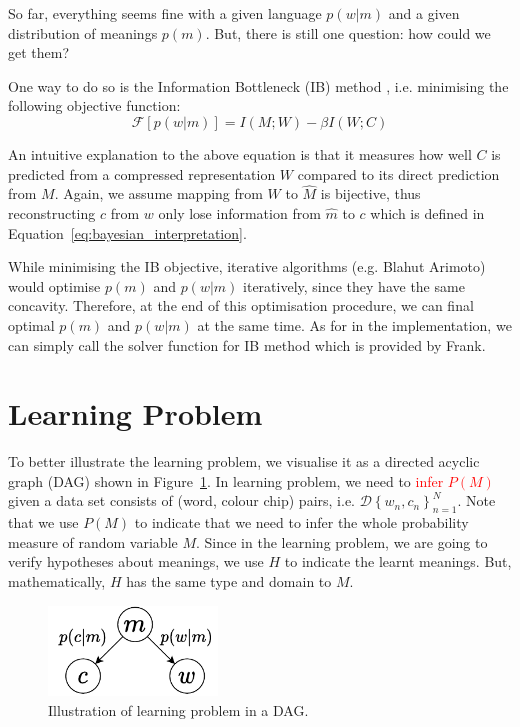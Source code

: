 \documentclass[11pt]{article}
\begin{document}
So far, everything seems fine with a given language $p(w|m)$ and a given distribution of meanings $p(m)$.
But, there is still one question: how could we get them?

One way to do so is the Information Bottleneck (IB) method \citep{IB}, i.e. minimising the following objective function:
\begin{equation}
    \mathcal{F}[p(w|m)] = I(M;W) - \beta I(W;C)
    \label{eq:comm_IB_objective}
\end{equation}

An intuitive explanation to the above equation is that it measures how well $C$ is predicted from a compressed representation $W$ compared to its direct prediction from $M$.
Again, we assume mapping from $W$ to $\hat{M}$ is bijective, thus reconstructing $c$ from $w$ only lose information from $\hat{m}$ to $c$ which is defined in Equation~\ref{eq:bayesian_interpretation}.

While minimising the IB objective, iterative algorithms (e.g. Blahut Arimoto\citep{BA}) would optimise $p(m)$ and $p(w|m)$ iteratively, since they have the same concavity.
Therefore, at the end of this optimisation procedure, we can final optimal $p(m)$ and $p(w|m)$ at the same time.
As for in the implementation, we can simply call the solver function for IB method which is provided by Frank.

\section{Learning Problem}
\label{sec:learning}

To better illustrate the learning problem, we visualise it as a directed acyclic graph (DAG) shown in Figure~\ref{fig:pipeline_dag}.
In learning problem, we need to \textcolor{red}{infer $P(M)$} given a data set consists of (word, colour chip) pairs, i.e. $\mathcal{D}\left\{w_n, c_n\right\}_{n=1}^{N}$.
Note that we use $P(M)$ to indicate that we need to infer the whole probability measure of random variable $M$.
Since in the learning problem, we are going to verify hypotheses about meanings, we use $H$ to indicate the learnt meanings.
But, mathematically, $H$ has the same type and domain to $M$.

\begin{figure}[h]
    \centering
    \includegraphics[width=0.4\textwidth]{docs/intro_rate_distortion/graphs/cog_comm_dag.pdf}
    \caption{Illustration of learning problem in a DAG.}
    \label{fig:pipeline_dag}
\end{figure}
\end{document}
